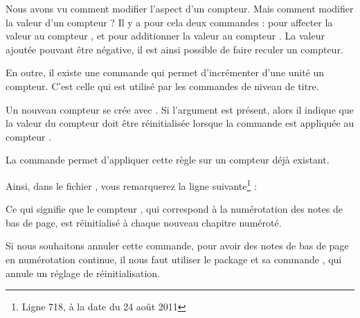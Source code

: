 Nous avons vu comment modifier l'aspect d'un compteur. Mais comment modifier la valeur d'un compteur ? Il y a pour cela deux commandes :  pour affecter la valeur  au compteur , et  pour additionner la valeur  au compteur . La valeur ajoutée pouvant être négative, il est ainsi possible de faire reculer un compteur.

En outre, il existe une commande  qui permet d'incrémenter d'une unité un compteur. C'est celle qui est utilisé par les commandes de niveau de titre.



Un nouveau compteur se crée  avec
 . 
Si l'argument  est présent, alors il indique que la valeur du compteur  doit être réinitialisée lorsque la commande  est appliquée au compteur .

La commande    permet d'appliquer cette règle sur un compteur déjà existant.

Ainsi, dans le fichier , vous remarquerez la ligne suivante\footnote{Ligne 718, à la date du 24 août 2011}  :

\begin{latexcode}
\end{latexcode} 

Ce qui signifie que le compteur  , qui correspond à la numérotation des notes de bas de page, est réinitialisé à chaque nouveau chapitre numéroté. 

Si nous souhaitons annuler cette commande, pour avoir des notes de bas de page en numérotation continue, il nous faut utiliser le package  et sa commande , qui annule un réglage de réinitialisation.

\begin{latexcode}
\usepackage{remreset}
\makeatletter
{}
\makeatother
\end{latexcode}
